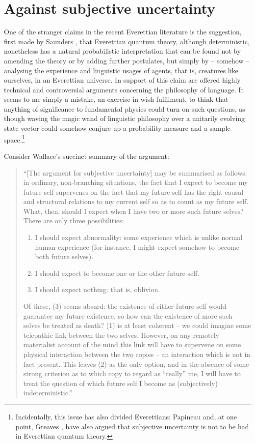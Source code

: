 \documentclass[aps,
pra,epsfig,12pt,nofootinbib]{revtex4}
\begin{document}
\section{Against subjective uncertainty}

One of the stranger claims in the recent Everettian literature is the
suggestion, first made by Saunders \cite{saundersprob, 
saundersvol, saunderswallace, wallaceepiq}, 
that Everettian quantum
theory, although deterministic, nonetheless has a natural
probabilistic interpretation that can be found not by amending the theory or
by adding further postulates, but simply by -- somehow -- analysing the
experience and linguistic usages of agents, that is, creatures 
like ourselves, in an
Everettian universe.  In support of this claim are offered highly
technical and controversial arguments concerning the philosophy of language.
It seems to me simply a mistake, an exercise in wish fulfilment, to 
think that anything of significance to fundamental physics could turn on such 
questions, as though waving the magic wand of linguistic philosophy over
a unitarily evolving state vector could somehow conjure up 
a probability measure and a sample space.\footnote{Incidentally,
this issue has also divided Everettians: Papineau \cite{papineausu} 
and, at one point, Greaves \cite{greavessu},
have also argued that subjective uncertainty is not to be had in 
Everettian quantum theory.}   

Consider Wallace's succinct summary \cite{wallaceepiq} of the argument: 

\begin{quotation}
``[The argument for subjective uncertainty] may be summarised as
follows: in ordinary, non-branching situations, the fact that I expect to become
my future self supervenes on the fact that my future self has 
the right causal and
structural relations to my current self so as to count as my future self. What,
then, should I expect when I have two or more such future selves? There are
only three possibilities:
\begin{enumerate}
\item I should expect 
abnormality: some experience which is unlike normal human
experience (for instance, I might expect somehow to become both
future selves).
\item I should expect to become one or the other future self.
\item I should expect nothing: that is, oblivion.
\end{enumerate}

Of these, (3) seems absurd: the existence of either future self would guarantee
my future existence, so how can the existence of more such selves be treated
as death? (1) is at least coherent -- we could imagine some telepathic link
between the two selves. However, on any remotely materialist account of the
mind this link will have to supervene on some physical interaction between the
two copies -- an interaction which is not in fact present. This leaves (2) as the
only option, and in the absence of some strong criterion as to which copy to
regard as ``really'' me, I will have to treat 
the question of which future self I
become as (subjectively) indeterministic.''
\end{quotation}
\end{document}
